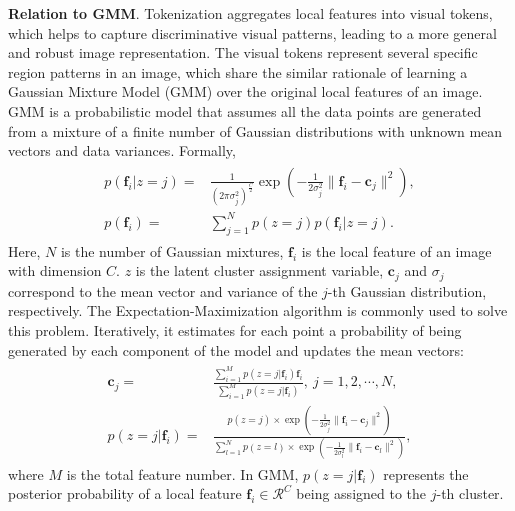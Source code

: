 \documentclass[letterpaper]{article} \usepackage{aaai22}  \usepackage{times}  \usepackage{helvet}  \usepackage{courier}  \usepackage[hyphens]{url}  \usepackage{graphicx} \urlstyle{rm} \def\UrlFont{\rm}  \usepackage{natbib}  \usepackage{caption} \DeclareCaptionStyle{ruled}{labelfont=normalfont,labelsep=colon,strut=off} \frenchspacing  \setlength{\pdfpagewidth}{8.5in}  \setlength{\pdfpageheight}{11in}  \usepackage{algorithm}
\begin{document}
\noindent\textbf{Relation to GMM}.
Tokenization aggregates local features into visual tokens, which helps to capture discriminative visual patterns, leading to a more general and robust image representation. 
The visual tokens represent several specific region patterns in an image, which share the similar rationale of learning a Gaussian Mixture Model (GMM) over the original local features of an image. GMM is a probabilistic model that assumes all the data points are generated from a mixture of a finite number of Gaussian distributions with unknown mean vectors and data variances. Formally,
\begin{eqnarray}\label{eq:gmm}
	\begin{aligned} 
		p(\bm{f}_i| z=j) = & \frac{1}{(2\pi \sigma_{j}^2)^\frac{C}{2}} \exp\left( - \frac{1}{2\sigma_j^2} \| \bm{f}_i - \mathbf{c}_j \|^2 \right), \\
		 p(\bm{f}_i) = & \sum_{j=1}^N p(z=j)p(\bm{f}_i| z=j).
	\end{aligned}
\end{eqnarray}
Here, $N$ is the number of Gaussian mixtures, $\bm{f}_i$ is the local feature of an image with dimension $C$. $z$ is the latent
cluster assignment variable, $\mathbf{c}_j$ and $\sigma_j$ correspond to the mean vector and variance of the $j$-th Gaussian distribution, respectively.
The Expectation-Maximization algorithm is commonly used to solve this problem. Iteratively, it estimates for each point a probability of being generated by each component of the model and updates the mean vectors:
\begin{eqnarray}\label{eq:gmm_update}
	\begin{aligned} 
		\mathbf{c}_j = & \frac{\sum_{i=1}^M p(z=j | \bm{f}_i)\bm{f}_i}{\sum_{i=1}^M p(z=j | \bm{f}_i)}, \ j=1,2,\cdots,N, \\
		p(z=j | \bm{f}_i) = & \frac{p(z=j) \times \exp\left( - \frac{1}{2\sigma_j^2} \| \bm{f}_i - \mathbf{c}_j \|^2 \right)}{\sum_{l=1}^N p(z=l) \times \exp\left( - \frac{1}{2\sigma_l^2} \| \bm{f}_i - \mathbf{c}_l \|^2 \right) },
	\end{aligned}
\end{eqnarray}
where $M$ is the total feature number. In GMM, $p(z=j | \bm{f}_i)$ represents the posterior probability of a local feature $\bm{f}_i \in \mathcal{R}^C$ being assigned to the $j$-th cluster.
\end{document}
